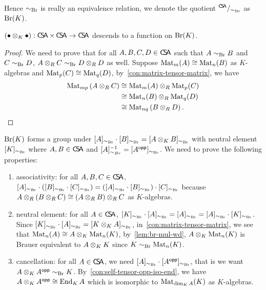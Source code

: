 Hence $\sim_{\Br}$ is really an equivalence relation, we denote the quotient ${}^{\CSA}/_{\sim_{\Br}}$ as $\Br(K)$.

\begin{lemma}\label{lem:br-mul-wd}
  $(\bullet\otimes_{K}\bullet):\CSA\times\CSA \to \CSA$ descends to a function on $\Br(K)$.
  \leanok
\end{lemma}
\begin{proof}
  We need to prove that for all $A, B, C, D \in \CSA$ such that $A\sim_{\Br} B$ and $C\sim_{\Br}D$, $A\otimes_{R}C \sim_{\Br} D\otimes_{R}D$ as well.
  Suppose $\Mat_{m}(A)\cong \Mat_{n}(B)$ as $K$-algebras and $\Mat_{p}(C)\cong\Mat_{q}(D)$, by~\cref{con:matrix-tensor-matrix}, we have
  \[
    \begin{aligned}
      \Mat_{mp}\left(A\otimes_{R} C\right)&\cong \Mat_{m}(A)\otimes_{R}\Mat_{p}(C) \\
                                          &\cong \Mat_{n}(B)\otimes_{R}\Mat_{q}(D)\\
      &\cong \Mat_{nq}\left(B\otimes_{R}D\right).
    \end{aligned}
  \]

\end{proof}

\begin{construction}\label{con:br}
  $\Br(K)$ forms a group under $[A]_{\sim_{\Br}}\cdot[B]_{\sim_{\Br}}=[A\otimes_{K}B]_{\sim_{\Br}}$ with neutral element $[K]_{\sim_{\Br}}$ where $A, B\in\CSA$ and $[A]_{\sim_{Br}}^{-1}=[A^{\opp}]_{\sim_{\Br}}$. We need to prove the following properties:
  \begin{enumerate}
    \item associativity: for all $A, B, C\in\CSA$, $[A]_{\sim_{\Br}}\cdot\left([B]_{\sim_{\Br}}\cdot[C]_{\sim_{\Br}}\right)=\left([A]_{\sim_{\Br}}\cdot[B]_{\sim_{\Br}}\right)\cdot [C]_{\sim_{\Br}}$ because $A\ox_{R}\left(B\ox_{R}C\right)\cong \left(A\ox_{R}B\right)\ox_{R}C$ as $K$-algebras.
    \item neutral element: for all $A\in \CSA$, $[K]_{\sim_{\Br}}\cdot[A]_{\sim_{\Br}}=[A]_{\sim_{\Br}}=[A]_{\sim_{\Br}}\cdot [K]_{\sim_{\Br}}$. Since $[K]_{\sim_{\Br}}\cdot[A]_{\sim_{\Br}}=[K\ox_{K} A]_{\sim_{\Br}}$, in~\cref{con:matrix-tensor-matrix}, we see that $\Mat_{n}(A)\cong A\ox_{K}\Mat_{n}(K)$, by~\cref{lem:br-mul-wd}, $A\ox_{K}\Mat_{n}(K)$ is Brauer equivalent to $A\ox_{K} K$ since $K\sim_{\Br}\Mat_{n}(K)$.
    \item cancellation: for all $A \in \CSA$, we need $[A]_{\sim_{\Br}}\cdot[A^{\opp}]_{\sim_{\Br}}$, that is we want $A\ox_{K}A^{\opp}\sim_{\Br} K$. By~\cref{con:self-tensor-opp-iso-end}, we have $A\ox_{K}A^{\opp}\cong \End_{K}A$ which is isomorphic to $\Mat_{\dim_{K}A}(K)$ as $K$-algebras.
  \end{enumerate}
  \leanok
\end{construction}

